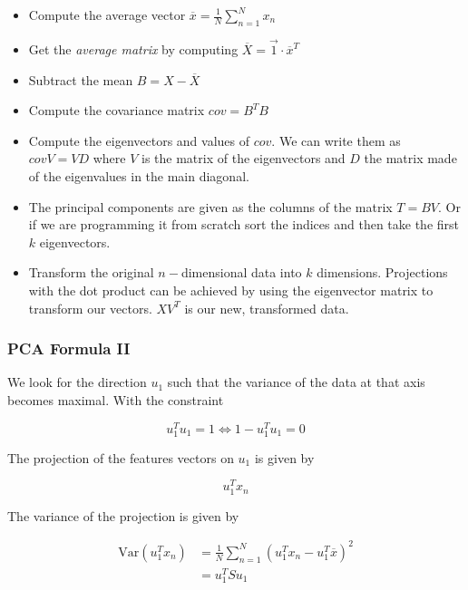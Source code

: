 \begin{itemize}
 
    \item Compute the average vector  \(\overline{x} = \frac{1}{N} \sum_{n = 1}^{N} x_n\)

    \item Get the \emph{average matrix} by computing \(\overline{X} = \vec{1} \cdot \overline{x}^T\)

    \item Subtract the mean \(B = X - \overline{X}\)

    \item Compute the covariance matrix \(cov = B^T B\)

    \item Compute the eigenvectors and values of \(cov\). We can write them as \(cov V = VD\) where \(V\) is the matrix of the eigenvectors and
    \(D\) the matrix made of the eigenvalues in the main diagonal.

    \item The principal components are given as the columns of the matrix \(T = BV\). Or if we are programming it from 
    scratch sort the indices and then take the first \(k\) eigenvectors.

    \item Transform the original \(n-\)dimensional data into \(k\) dimensions. Projections with the dot product can be achieved by using the 
    eigenvector matrix to transform our vectors. \(XV^T\) is our new, transformed data. 

\end{itemize}

\subsubsection{PCA Formula II}

We look for the direction \(u_1\) such that the variance of the data at that axis becomes maximal.
With the constraint 

\[
    u_1^T u_1 = 1 \iff 1 - u_1^T u_1 = 0  
\]

The projection of the features vectors on \(u_1\) is given by 

\[
    u_1^T x_n
\]

The variance of the projection is given by 

\begin{align*} 
    \mathrm{Var}(u_1^T x_n) &= \frac{1}{N} \sum_{n = 1}^{N} (u_1^T x_n - u_1^T \overline{x})^2  \\ 
    &= u_1^T S u_1
\end{align*}

